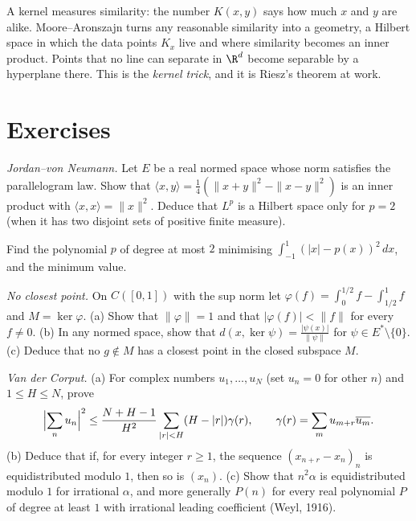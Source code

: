 \begin{beauty}
A kernel measures similarity: the number $K(x,y)$ says how much $x$ and $y$ are alike. Moore--Aronszajn turns any reasonable similarity into a geometry, a Hilbert space in which the data points $K_x$ live and where similarity becomes
an inner product. Points that no line can separate in $\R^d$ become separable by a hyperplane there. This is the \emph{kernel trick}, and it is Riesz's theorem at work.
\end{beauty}

\section{Exercises}

\begin{exercise}[$\star\star$]\label{ex:jvn}
\emph{Jordan--von Neumann.} Let $E$ be a real normed space whose norm satisfies the parallelogram law. Show that $\langle x,y\rangle=\frac14(\|x+y\|^2-\|x-y\|^2)$ is an inner product with $\langle x,x\rangle=\|x\|^2$. Deduce that
$L^p$ is a Hilbert space only for $p=2$ (when it has two disjoint sets of positive finite measure).
\end{exercise}

\begin{exercise}[$\star$]\label{ex:legendrefit}
Find the polynomial $p$ of degree at most $2$ minimising $\int_{-1}^1(|x|-p(x))^2\,dx$, and the minimum value.
\end{exercise}

\begin{exercise}[$\star\star$]\label{ex:noclosest}
\emph{No closest point.} On $C([0,1])$ with the sup norm let $\varphi(f)=\int_0^{1/2}f-\int_{1/2}^1f$ and $M=\ker\varphi$. (a) Show that $\|\varphi\|=1$ and that $|\varphi(f)|<\|f\|$ for every $f\ne0$. (b) In any normed space, show that
$d(x,\ker\psi)=\frac{|\psi(x)|}{\|\psi\|}$ for $\psi\in E^*\setminus\{0\}$. (c) Deduce that no $g\notin M$ has a closest point in the closed subspace $M$.
\end{exercise}

\begin{exercise}[$\star\star\star$]\label{ex:vandercorput}
\emph{Van der Corput.} (a) For complex numbers $u_1,\dots,u_N$ (set $u_n=0$ for other $n$) and $1\le H\le N$, prove
\[\Bigl|\sum_nu_n\Bigr|^2\le\frac{N+H-1}{H^2}\sum_{|r|<H}(H-|r|)\gamma(r),\qquad\gamma(r)=\sum_mu_{m+r}\overline{u_m}.\]
(b) Deduce that if, for every integer $r\ge1$, the sequence $(x_{n+r}-x_n)_n$ is equidistributed modulo $1$, then so is $(x_n)$. (c) Show that $n^2\alpha$ is equidistributed modulo $1$ for irrational $\alpha$, and more generally $P(n)$ for
every real polynomial $P$ of degree at least $1$ with irrational leading coefficient (Weyl, 1916).
\end{exercise}

